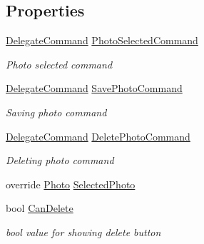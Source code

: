\subsection*{Properties}
\begin{DoxyCompactItemize}
\item 
\hyperlink{class_delegate_command}{Delegate\+Command} \hyperlink{class_field_service_1_1_win_r_t_1_1_view_models_1_1_photo_view_model_af301ce33204d5a46b21dd3d06e40e4b2}{Photo\+Selected\+Command}
\begin{DoxyCompactList}\small\item\em Photo selected command \end{DoxyCompactList}\item 
\hyperlink{class_delegate_command}{Delegate\+Command} \hyperlink{class_field_service_1_1_win_r_t_1_1_view_models_1_1_photo_view_model_ac182effcfa4ec708900f6affdf80780a}{Save\+Photo\+Command}
\begin{DoxyCompactList}\small\item\em Saving photo command \end{DoxyCompactList}\item 
\hyperlink{class_delegate_command}{Delegate\+Command} \hyperlink{class_field_service_1_1_win_r_t_1_1_view_models_1_1_photo_view_model_a2c0537cfad9e07066a8827b546f78007}{Delete\+Photo\+Command}
\begin{DoxyCompactList}\small\item\em Deleting photo command \end{DoxyCompactList}\item 
override \hyperlink{class_field_service_1_1_data_1_1_photo}{Photo} \hyperlink{class_field_service_1_1_win_r_t_1_1_view_models_1_1_photo_view_model_a7da5a8139584ddbeadc08df3005b5a30}{Selected\+Photo}
\item 
bool \hyperlink{class_field_service_1_1_win_r_t_1_1_view_models_1_1_photo_view_model_a70f7c0feaed8cb102858f714267e46cc}{Can\+Delete}
\begin{DoxyCompactList}\small\item\em bool value for showing delete button \end{DoxyCompactList}\item 

\end{DoxyCompactItemize}
